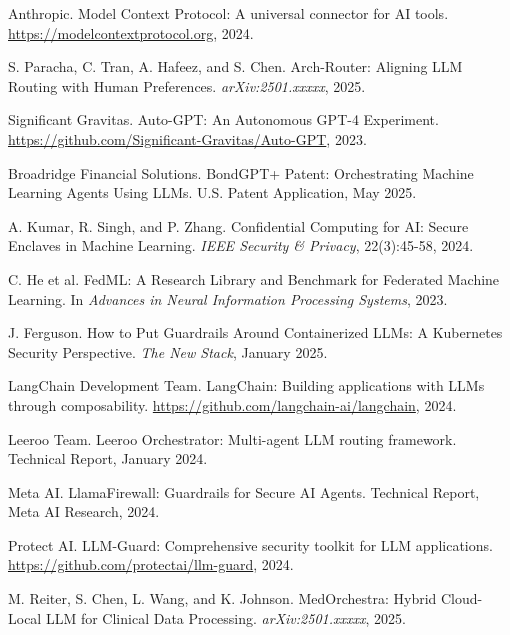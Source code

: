 \documentclass[11pt]{article}
\begin{document}

\begin{thebibliography}{25}

Anthropic.
\newblock Model Context Protocol: A universal connector for AI tools.
\newblock \url{https://modelcontextprotocol.org}, 2024.

S. Paracha, C. Tran, A. Hafeez, and S. Chen.
\newblock Arch-Router: Aligning LLM Routing with Human Preferences.
\newblock \emph{arXiv:2501.xxxxx}, 2025.

Significant Gravitas.
\newblock Auto-GPT: An Autonomous GPT-4 Experiment.
\newblock \url{https://github.com/Significant-Gravitas/Auto-GPT}, 2023.

Broadridge Financial Solutions.
\newblock BondGPT+ Patent: Orchestrating Machine Learning Agents Using LLMs.
\newblock U.S. Patent Application, May 2025.

A. Kumar, R. Singh, and P. Zhang.
\newblock Confidential Computing for AI: Secure Enclaves in Machine Learning.
\newblock \emph{IEEE Security \& Privacy}, 22(3):45-58, 2024.

C. He et al.
\newblock FedML: A Research Library and Benchmark for Federated Machine Learning.
\newblock In \emph{Advances in Neural Information Processing Systems}, 2023.

J. Ferguson.
\newblock How to Put Guardrails Around Containerized LLMs: A Kubernetes Security Perspective.
\newblock \emph{The New Stack}, January 2025.

LangChain Development Team.
\newblock LangChain: Building applications with LLMs through composability.
\newblock \url{https://github.com/langchain-ai/langchain}, 2024.

Leeroo Team.
\newblock Leeroo Orchestrator: Multi-agent LLM routing framework.
\newblock Technical Report, January 2024.

Meta AI.
\newblock LlamaFirewall: Guardrails for Secure AI Agents.
\newblock Technical Report, Meta AI Research, 2024.

Protect AI.
\newblock LLM-Guard: Comprehensive security toolkit for LLM applications.
\newblock \url{https://github.com/protectai/llm-guard}, 2024.

M. Reiter, S. Chen, L. Wang, and K. Johnson.
\newblock MedOrchestra: Hybrid Cloud-Local LLM for Clinical Data Processing.
\newblock \emph{arXiv:2501.xxxxx}, 2025.


\end{thebibliography}
\end{document}
